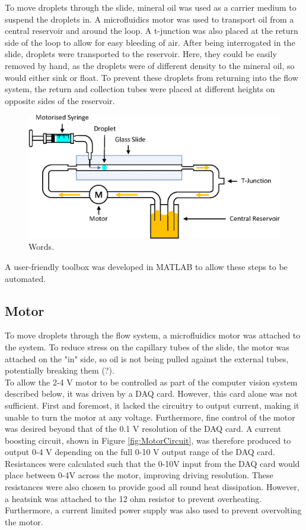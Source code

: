 \documentclass{physics_article_B}
\begin{document}
To move droplets through the slide, mineral oil was used as a carrier medium to suspend the droplets in. A microfluidics motor was used to transport oil from a central reservoir and around the loop. A t-junction was also placed at the return side of the loop to allow for easy bleeding of air. After being interrogated in the slide, droplets were transported to the reservoir. Here, they could be easily removed by hand, as the droplets were of different density to the mineral oil, so would either sink or float. To prevent these droplets from returning into the flow system, the return and collection tubes were placed at different heights on opposite sides of the reservoir. 
\begin{figure}[H]
\centering
\hspace*{-0.9cm}\includegraphics[scale=0.8]{Figures/Fluid.eps}
\captionsetup{justification=centering}
\caption{Words.} 	
\label{fig:basic}
\end{figure} 

A user-friendly toolbox was developed in MATLAB to allow these steps to be automated.
    
    \subsection{Motor}
    To move droplets through the flow system, a microfluidics motor was attached to the system. To reduce stress on the capillary tubes of the slide, the motor was attached on the "in" side, so oil is not being pulled against the external tubes, potentially breaking them (?).\\
    
    To allow the 2-4 V motor to be controlled as part of the computer vision system described below, it was driven by a DAQ card. However, this card alone was not sufficient. First and foremost, it lacked the circuitry to output current, making it unable to turn the motor at any voltage. Furthermore, fine control of the motor was desired beyond that of the 0.1 V resolution of the DAQ card. A current boosting circuit, shown in Figure \ref{fig:MotorCircuit}, was therefore produced to output 0-4 V depending on the full 0-10 V output range of the DAQ card. Resistances were calculated such that the 0-10V input from the DAQ card would place between 0-4V across the motor, improving driving resolution. These resistances were also chosen to provide good all round heat dissipation. However, a heatsink was attached to the 12 ohm resistor to prevent overheating. Furthermore, a current limited power supply was also used to prevent overvolting the motor. 
    
\end{document}
